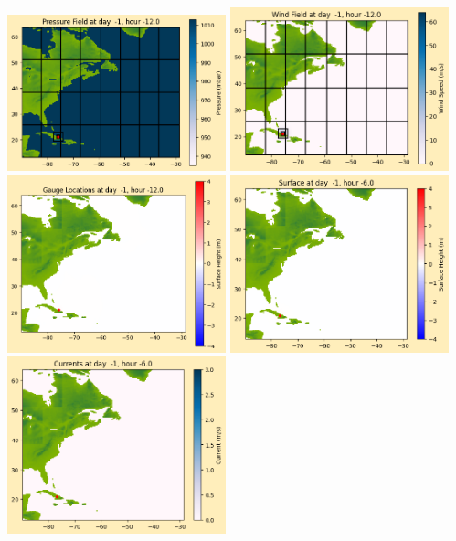 \documentclass[11pt]{article}
\begin{document}
\includegraphics[width=0.475\textwidth]{frame0006fig1012.png}
\vskip 10pt 
\includegraphics[width=0.475\textwidth]{frame0006fig1013.png}
\includegraphics[width=0.475\textwidth]{frame0006fig1014.png}
\vskip 10pt 
\includegraphics[width=0.475\textwidth]{frame0007fig1001.png}
\includegraphics[width=0.475\textwidth]{frame0007fig1002.png}
\end{document}
